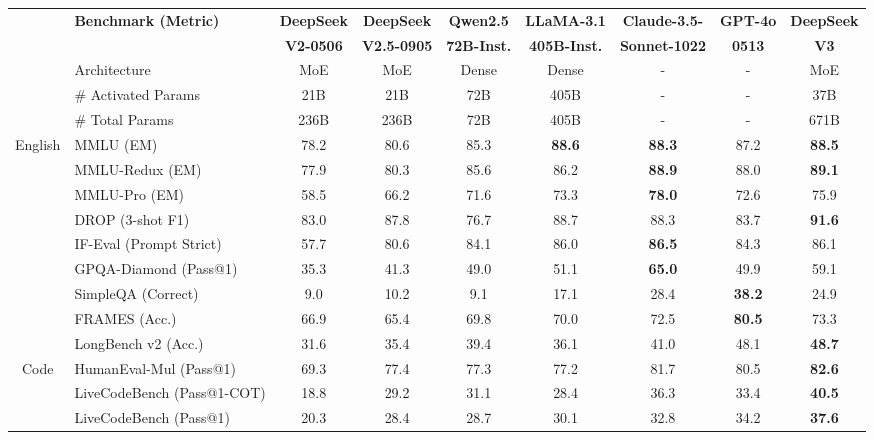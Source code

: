 \begin{table}[ht]
    \centering
    \footnotesize
    \setlength{\tabcolsep}{1.9pt}
    \begin{tabular}{@{}c l | c  c | c c c c| c@{}}
    \toprule
    & \multirow{2}{*}{\centering \textbf{Benchmark {\tiny (Metric)}}} & {\textbf{DeepSeek}} & {\textbf{DeepSeek}} & \textbf{Qwen2.5} & \textbf{LLaMA-3.1}  & \textbf{Claude-3.5-}  & \textbf{GPT-4o}& \textbf{DeepSeek} \\
    & & \textbf{V2-0506}& \textbf{V2.5-0905} & \textbf{72B-Inst.} & \textbf{405B-Inst.} & \textbf{Sonnet-1022}  & \textbf{0513} & \textbf{V3} \\
    \midrule
    & Architecture &  MoE & MoE & Dense & Dense &-&- & MoE \\
    & \# Activated Params & 21B & 21B & 72B & 405B& -&-& 37B \\
    & \# Total Params &  236B & 236B & 72B & 405B &-&-& 671B \\
    \midrule
    \multirow{8}{*}{English}&   MMLU {\tiny (EM)}  & 78.2 & 80.6 & 85.3& \textbf{88.6} & \textbf{88.3}&87.2 & \textbf{88.5} \\
     & MMLU-Redux {\tiny (EM)} &77.9 & 80.3 &  85.6 &86.2& \textbf{88.9}& 88.0 & \textbf{89.1}\\
    & MMLU-Pro {\tiny (EM)} & 58.5 &  66.2 & 71.6 &73.3 & \textbf{78.0} & 72.6 & 75.9\\
    & DROP {\tiny (3-shot F1)} &83.0 & 87.8 & 76.7 & 88.7 & 88.3 & 83.7 & \textbf{91.6}\\
    & IF-Eval {\tiny (Prompt Strict)} &57.7 & 80.6 & 84.1 & 86.0 & \textbf{86.5} & 84.3 & 86.1\\
    & GPQA-Diamond {\tiny (Pass@1)} & 35.3 & 41.3& 49.0 & 51.1& \textbf{65.0} & 49.9 & 59.1\\
    & SimpleQA {\tiny (Correct)} & 9.0 & 10.2 & 9.1 & 17.1& 28.4 & \textbf{38.2}& 24.9\\
     & FRAMES {\tiny (Acc.)} & 66.9 & 65.4 & 69.8 & 70.0 & 72.5 & \textbf{80.5} & 73.3 \\
     & LongBench v2 {\tiny (Acc.)} & 31.6 & 35.4 & 39.4 & 36.1 & 41.0 & 48.1 &\textbf{48.7} \\
    \midrule
    \multirow{5}{*}{Code} & HumanEval-Mul {\tiny (Pass@1)} & 69.3 &77.4 & 77.3 & 77.2 & {81.7} &80.5&\textbf{82.6}\\
    & LiveCodeBench {\tiny (Pass@1-COT)} &18.8 & 29.2 & 31.1 & 28.4 & 36.3& 33.4& \textbf{40.5} \\
    & LiveCodeBench {\tiny (Pass@1)} &20.3 & 28.4 & 28.7 & 30.1 & 32.8& 34.2& \textbf{37.6} \\

\end{tabular}
\end{table}
